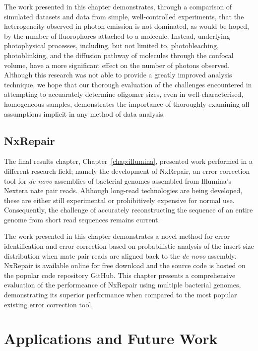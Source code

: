 The work presented in this chapter demonstrates, through a comparison of simulated datasets and data from simple, well-controlled experiments, that the heterogeneity observed in photon emission is not dominated, as would be hoped, by the number of fluorophores attached to a molecule. Instead, underlying photophysical processes, including, but not limited to, photobleaching, photoblinking, and the diffusion pathway of molecules through the confocal volume, have a more significant effect on the number of photons observed. Although this research was not able to provide a greatly improved analysis technique, we hope that our thorough evaluation of the challenges encountered in attempting to accuarately determine oligomer sizes, even in well-characterised, homogeneous samples, demonstrates the importance of thoroughly examining all assumptions implicit in any method of data analysis.   

\subsection{NxRepair}
The final results chapter, Chapter~\ref{chap:illumina}, presented work performed in a different research field; namely the development of NxRepair, an error correction tool for \emph{de novo} assemblies of bacterial genomes assembled from Illumina's Nextera nate pair reads. Although long-read technologies are being developed, these are either still experimental or prohibitively expensive for normal use. Consequently, the challenge of accurately reconstructing the sequence of an entire genome from short read sequences remains current. 

The work presented in this chapter demonstrates a novel method for error identification and error correction based on probabilistic analysis of the insert size distribution when mate pair reads are aligned back to the \emph{de novo} assembly. NxRepair is available online for free download and the source code is hosted on the popular code repository GitHub.  This chapter presents a comprehensive evaluation of the performcance of NxRepair using multiple bacterial genomes, demonstrating its superior performance when compared to the most popular existing error correction tool.

\section{Applications and Future Work}

